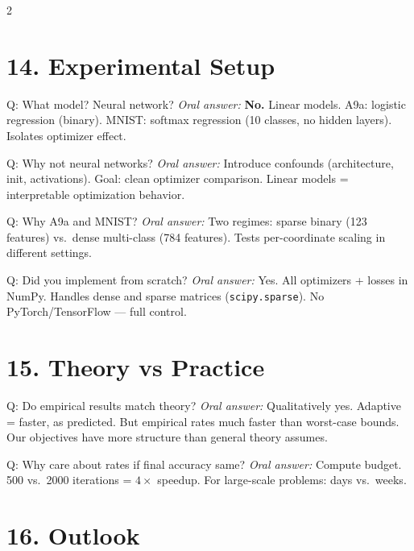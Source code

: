\documentclass[a4paper,9pt]{article}
\newcommand{\oral}{\textit{\color{darkgray}Oral answer: }}
\begin{document}
\begin{multicols}{2}
\section{14. Experimental Setup}

\begin{qa}{Q: What model? Neural network?}
\oral \textbf{No.} Linear models.
A9a: logistic regression (binary).
MNIST: softmax regression (10 classes, no hidden layers).
Isolates optimizer effect.
\end{qa}

\begin{qa}{Q: Why not neural networks?}
\oral Introduce confounds (architecture, init, activations).
Goal: clean optimizer comparison.
Linear models = interpretable optimization behavior.
\end{qa}

\begin{qa}{Q: Why A9a and MNIST?}
\oral Two regimes: sparse binary (123 features) vs.\ dense multi-class (784 features).
Tests per-coordinate scaling in different settings.
\end{qa}

\begin{qa}{Q: Did you implement from scratch?}
\oral Yes. All optimizers + losses in NumPy.
Handles dense and sparse matrices (\texttt{scipy.sparse}).
No PyTorch/TensorFlow --- full control.
\end{qa}

\section{15. Theory vs Practice}

\begin{qa}{Q: Do empirical results match theory?}
\oral Qualitatively yes. Adaptive = faster, as predicted.
But empirical rates much faster than worst-case bounds.
Our objectives have more structure than general theory assumes.
\end{qa}

\begin{qa}{Q: Why care about rates if final accuracy same?}
\oral Compute budget. 500 vs.\ 2000 iterations = \(4\times\) speedup.
For large-scale problems: days vs.\ weeks.
\end{qa}

\section{16. Outlook}


\end{multicols}
\end{document}
